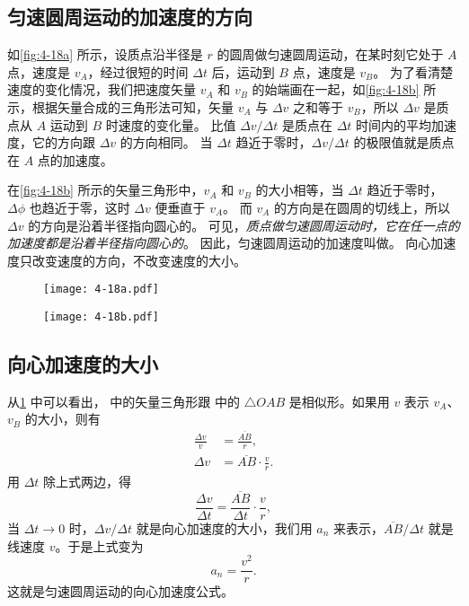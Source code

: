 \subsection{匀速圆周运动的加速度的方向} 
如\cref{fig:4-18a} 所示，设质点沿半径是 $r$ 的圆周做匀速圆周运动，在某时刻它处于 $A$ 点，速度是 $v_A$，经过很短的时间 $\Delta t$ 后，运动到 $B$ 点，速度是 $v_B$。
为了看清楚速度的变化情况，我们把速度矢量 $v_A$ 和 $v_B$ 的始端画在一起，如\cref{fig:4-18b} 所示，根据矢量合成的三角形法可知，矢量 $v_A$ 与 $\Delta v$ 之和等于 $v_B$，所以 $\Delta v$ 是质点从 $A$ 运动到 $B$ 时速度的变化量。
比值 $\Delta v/\Delta t$ 是质点在 $\Delta t$ 时间内的平均加速度，它的方向跟 $\Delta v$ 的方向相同。
当 $\Delta t$ 趋近于零时，$\Delta v/\Delta t$ 的极限值就是质点在 $A$ 点的加速度。

在\cref{fig:4-18b} 所示的矢量三角形中，$v_A$ 和 $v_B$ 的大小相等，当 $\Delta t$ 趋近于零时，$\Delta \phi$ 也趋近于零，这时 $\Delta v$ 便垂直于 $v_A$。
而 $v_A$ 的方向是在圆周的切线上，所以 $\Delta v$ 的方向是沿着半径指向圆心的。
可见，\emph{质点做匀速圆周运动时，它在任一点的加速度都是沿着半径指向圆心的}。
因此，匀速圆周运动的加速度叫做。
向心加速度只改变速度的方向，不改变速度的大小。

\begin{figure}
  \begin{minipage}{0.45\linewidth}\centering
    \texttt{[image: 4-18a.pdf]}
    \subcaption{}\label{fig:4-18a}
  \end{minipage}
  \begin{minipage}{0.45\linewidth}\centering
    \texttt{[image: 4-18b.pdf]}
    \subcaption{}\label{fig:4-18b}
  \end{minipage}
  \caption{}\label{fig:4-18}
\end{figure}

\subsection{向心加速度的大小} 

从\cref{fig:4-18} 中可以看出， 中的矢量三角形跟  中的 $\triangle OAB$ 是相似形。如果用 $v$ 表示 $v_A$、$v_B$ 的大小，则有
\[\begin{split}
\frac{\Delta v}{v}&=\frac{\overline{AB}}{r},\\
\Delta v &= \overline{AB}\cdot \frac{v}{r}.
\end{split} \]
用 $\Delta t$ 除上式两边，得
\[\frac{\Delta v}{\Delta t}=\frac{\overline{AB}}{\Delta t}\cdot \frac{v}{r}, \]
当 $\Delta t\to 0$ 时，$\Delta v/\Delta t$ 就是向心加速度的大小，我们用 $a_n$ 来表示，$\overline{AB}/\Delta t$ 就是线速度 $v$。于是上式变为
\[a_n=\frac{v^2}{r}.\]
这就是匀速圆周运动的向心加速度公式。

